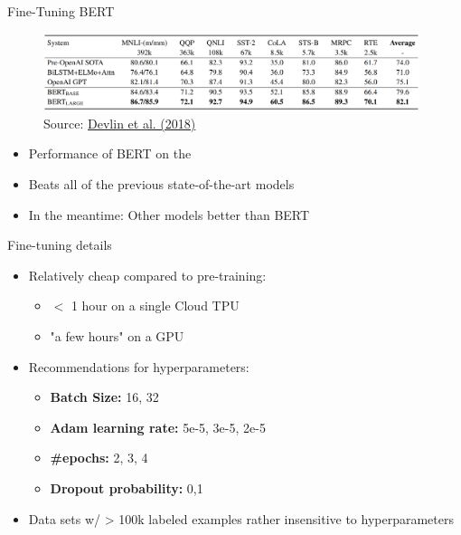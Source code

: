 \begin{frame}{Fine-Tuning BERT}

\vspace{1.5cm}

	\begin{figure}
	\centering
		\includegraphics[width = 11cm]{figure/bert-sota.png}\\ 
		\footnotesize{Source:} \href{https://arxiv.org/pdf/1810.04805.pdf}{\footnotesize Devlin et al. (2018)}
	\end{figure}
\begin{itemize}
	\item Performance of BERT on the \href{https://gluebenchmark.com/}{}
	\item Beats all of the previous state-of-the-art models
	\item In the meantime: Other models better than BERT
\end{itemize}

\end{frame}


\begin{frame}{Fine-tuning details}

\vfill

\begin{itemize}
	\item Relatively cheap compared to pre-training:
		\begin{itemize}
			\item $<$ 1 hour on a single Cloud TPU
			\item "a few hours" on a GPU
		\end{itemize}
	\item Recommendations for hyperparameters:
		\begin{itemize}
			\item \textbf{Batch Size:} 16, 32
			\item \textbf{Adam learning rate:} 5e-5, 3e-5, 2e-5
			\item \textbf{\#epochs:} 2, 3, 4
			\item \textbf{Dropout probability:} 0,1
		\end{itemize}
	\item Data sets w/ > 100k labeled examples rather insensitive to hyperparameters
\end{itemize}
	
\vfill

\end{frame}

